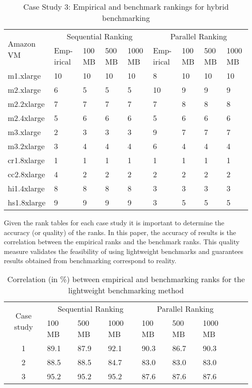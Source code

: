 \begin{table}[h]
\centering
\begin{tabular}{ |p{1.4cm}|p{0.4cm}|p{0.4cm}|p{0.4cm}|p{0.4cm}|p{0.4cm}|p{0.4cm}|p{0.4cm}|p{0.4cm}|  }
\hline
\multirow{2}{*}{Amazon VM} & \multicolumn{4}{|c|}{Sequential Ranking} &
\multicolumn{4}{|c|}{Parallel Ranking}\\ \cline{2-9}
& Emp-irical & 100 MB & 500 MB & 1000 MB & Emp-irical & 100 MB & 500 MB & 1000 MB \\
\hline
\hline
m1.xlarge 	&	10	&	10	&	10	&	10	&	8	&	10	&	10	&	10\\
m2.xlarge 	&	6	&	5	&	5	&	5	&	10	&	9	&	9	&	9\\
m2.2xlarge 	&	7	&	7	&	7	&	7	&	7	&	8	&	8	&	8\\
m2.4xlarge 	&	5	&	6	&	6	&	6	&	5	&	6	&	6	&	6\\
m3.xlarge 	&	2	&	3	&	3	&	3	&	9	&	7	&	7	&	7\\
m3.2xlarge 	&	3	&	4	&	4	&	4	&	6	&	4	&	4	&	4\\
cr1.8xlarge 	&	1	&	1	&	1	&	1	&	1	&	1	&	1	&	1\\
cc2.8xlarge 	&	4	&	2	&	2	&	2	&	2	&	2	&	2	&	2\\
hi1.4xlarge 	&	8	&	8	&	8	&	8	&	3	&	3	&	3	&	3\\
hs1.8xlarge 	&	9	&	9	&	9	&	9	&	3	&	5	&	5	&	5\\
\hline
\end{tabular}
\caption{Case Study 3: Empirical and benchmark rankings for hybrid benchmarking}
\label{table3-3}
\end{table}

Given the rank tables for each case study it is important to determine the accuracy (or quality) of the ranks. In this paper, the accuracy of results is the correlation between the empirical ranks and the benchmark ranks. This quality measure validates the feasibility of using lightweight benchmarks and guarantees results obtained from benchmarking correspond to reality. 

\begin{table}[h]
\centering
\begin{tabular}{ |c|p{0.6cm}|p{0.6cm}|p{0.6cm}|p{0.6cm}|p{0.6cm}|p{0.6cm}|p{0.6cm}|p{0.6cm}|  }
\hline
\multirow{2}{*}{Case study} & \multicolumn{3}{|c|}{Sequential Ranking} &
\multicolumn{3}{|c|}{Parallel Ranking}\\ \cline{2-7}
& 100 MB & 500 MB & 1000 MB & 100 MB & 500 MB & 1000 MB \\
\hline
\hline
1 & 89.1 & 87.9 & 92.1 & 90.3 & 86.7 & 90.3\\
2 & 88.5 & 88.5 & 84.7 & 83.0 & 83.0 & 83.0\\
3 & 95.2 & 95.2 & 95.2 & 87.6 & 87.6 & 87.6\\
\hline
\end{tabular}
\caption{Correlation (in \%) between empirical and benchmarking ranks for the lightweight benchmarking method}
\label{table4-1}
\end{table}

